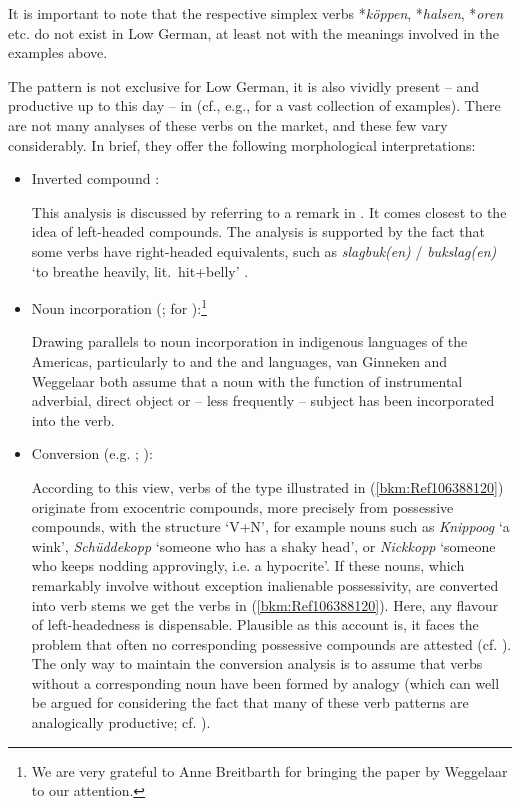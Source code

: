 \documentclass[output=paper
  ,nobabel
  ,draftmode
  ,colorlinks, citecolor=brown
]{langscibook}
\begin{document}
\noindent
It is important to note that the respective simplex verbs *\emph{köppen}, *\emph{halsen},
*\emph{oren} etc. do not exist in Low German, at least not with the meanings involved in the
examples above.

The pattern is not exclusive for Low German, it is also vividly present – and productive up to this
day – in  (cf., e.g., \citealt{AsdahlHolmberg1973} for a vast collection of
examples). There are not many analyses of these verbs on the market, and
these few vary considerably. In brief, they offer the following morphological interpretations:


\begin{itemize}
\item Inverted compound \citep{Henzen1965}:

This analysis is discussed by \citet[55--56]{AsdahlHolmberg1973} referring to a remark in
. It comes closest to the idea of left-headed compounds. The
analysis is supported by the fact that some verbs have right-headed equivalents, such as
\emph{slagbuk(en)} / \emph{bukslag(en)} `to breathe heavily, lit.\ hit+belly' \citep[53, 56]{AsdahlHolmberg1973}.

\largerpage
\item Noun incorporation (\citealt[Section~2]{vanGinneken1939}; \citealt{Weggelaar1986} for
  ):\footnote{We are very grateful to Anne Breitbarth for bringing the paper by Weggelaar
    to our attention.} 

Drawing parallels to noun incorporation in indigenous languages of the Americas, particularly to
 and the  and  languages, van Ginneken and Weggelaar both assume that a
noun with the function of instrumental adverbial, direct object or – less frequently – subject has
been incorporated into the verb.  

\item Conversion (e.g. \citealt[32--37]{Weise1920}; \citealt{AsdahlHolmberg1973}):

According to this view, verbs of the type illustrated in (\ref{bkm:Ref106388120}) originate from
exocentric compounds, more precisely from possessive compounds, with the structure `V+N', for
example nouns such as \emph{Knippoog} `a wink', \emph{Schüddekopp} `someone who has a shaky head',
or \emph{Nickkopp} `someone who keeps nodding approvingly, i.e. a hypocrite'. If these nouns, which
remarkably involve without exception inalienable possessivity, are converted into verb stems we get
the verbs in (\ref{bkm:Ref106388120}). Here, any flavour of left-headedness is
dispensable. Plausible as this account is, it faces the problem that often no corresponding
possessive compounds are attested (cf. \citealt[304]{Weggelaar1986}). The only way to maintain the
conversion analysis is to assume that verbs without a corresponding noun have been formed by analogy
(which can well be argued for considering the fact that many of these verb patterns are analogically
productive; cf. \citealt{AsdahlHolmberg1973}). 

\end{itemize}
\end{document}
